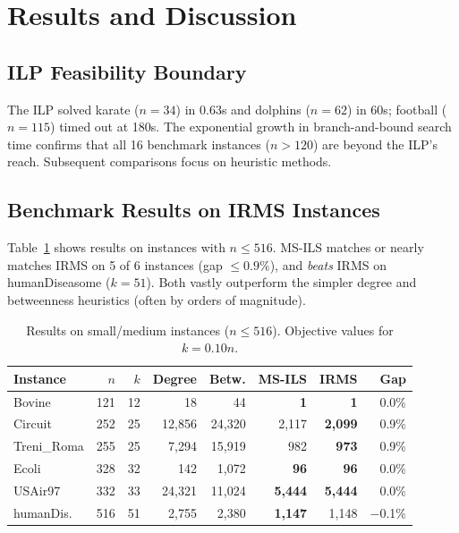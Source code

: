 \documentclass[11pt,a4paper]{article}
\begin{document}
\section{Results and Discussion}
\label{sec:results}

\subsection{ILP Feasibility Boundary}

The ILP solved karate ($n = 34$) in 0.63s and dolphins ($n = 62$) in 60s; football ($n = 115$) timed out at 180s. The exponential growth in branch-and-bound search time confirms that all 16 benchmark instances ($n > 120$) are beyond the ILP's reach. Subsequent comparisons focus on heuristic methods.

\subsection{Benchmark Results on IRMS Instances}

Table~\ref{tab:results_small} shows results on instances with $n \leq 516$. MS-ILS matches or nearly matches IRMS on 5 of 6 instances (gap $\leq 0.9\%$), and \emph{beats} IRMS on humanDiseasome ($k=51$). Both vastly outperform the simpler degree and betweenness heuristics (often by orders of magnitude).

\begin{table}[ht]
\centering
\caption{Results on small/medium instances ($n \leq 516$). Objective values for $k = 0.10n$.}
\label{tab:results_small}
\begin{tabular}{lrrrrrrr}
\toprule
Instance & $n$ & $k$ & Degree & Betw. & MS-ILS & IRMS & Gap \\
\midrule
Bovine & 121 & 12 & 18 & 44 & \textbf{1} & \textbf{1} & 0.0\% \\
Circuit & 252 & 25 & 12{,}856 & 24{,}320 & 2{,}117 & \textbf{2{,}099} & 0.9\% \\
Treni\_Roma & 255 & 25 & 7{,}294 & 15{,}919 & 982 & \textbf{973} & 0.9\% \\
Ecoli & 328 & 32 & 142 & 1{,}072 & \textbf{96} & \textbf{96} & 0.0\% \\
USAir97 & 332 & 33 & 24{,}321 & 11{,}024 & \textbf{5{,}444} & \textbf{5{,}444} & 0.0\% \\
humanDis. & 516 & 51 & 2{,}755 & 2{,}380 & \textbf{1{,}147} & 1{,}148 & $-$0.1\% \\
\bottomrule
\end{tabular}
\end{table}
\end{document}
